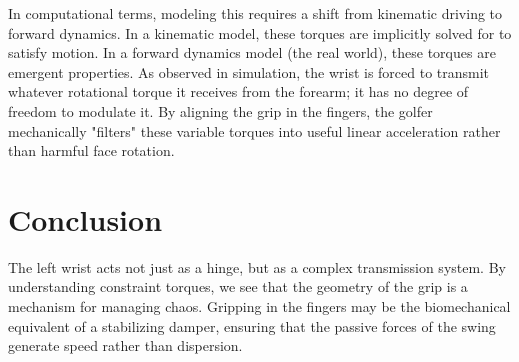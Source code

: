 \documentclass{article}
\begin{document}
In computational terms, modeling this requires a shift from kinematic driving to forward dynamics. In a kinematic model, these torques are implicitly solved for to satisfy motion. In a forward dynamics model (the real world), these torques are emergent properties. As observed in simulation, the wrist is forced to transmit whatever rotational torque it receives from the forearm; it has no degree of freedom to modulate it. By aligning the grip in the fingers, the golfer mechanically "filters" these variable torques into useful linear acceleration rather than harmful face rotation.

\section{Conclusion}
The left wrist acts not just as a hinge, but as a complex transmission system. By understanding constraint torques, we see that the geometry of the grip is a mechanism for managing chaos. Gripping in the fingers may be the biomechanical equivalent of a stabilizing damper, ensuring that the passive forces of the swing generate speed rather than dispersion.
\end{document}
